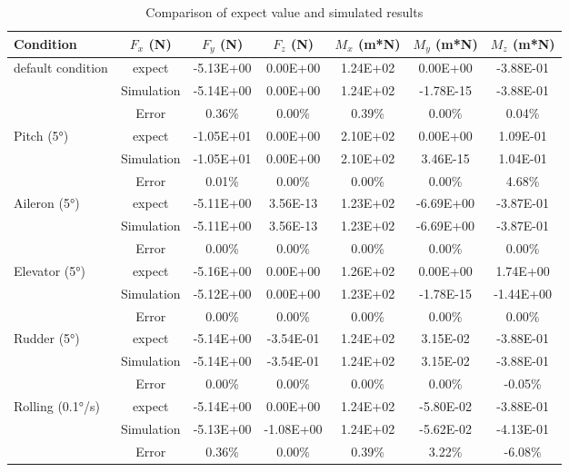 \begin{table}
\centering
\begin{tabular}{|l|c|c|c|c|c|c|}
\hline
\textbf{Condition} & \textbf{$F_{x}$ (N)} & \textbf{$F_{y}$ (N)} & \textbf{$F_{z}$ (N)} & \textbf{$M_{x}$ (m*N)} & \textbf{$M_{y}$ (m*N)} & \textbf{$M_{z}$ (m*N)} \\
\hline
default condition & expect & -5.13E+00 & 0.00E+00 & 1.24E+02 & 0.00E+00 & -3.88E-01 \\
& Simulation & -5.14E+00 & 0.00E+00 & 1.24E+02 & -1.78E-15 & -3.88E-01 \\
& Error & 0.36\% & 0.00\% & 0.39\% & 0.00\% & 0.04\% \\
\hline
Pitch (5°) & expect & -1.05E+01 & 0.00E+00 & 2.10E+02 & 0.00E+00 & 1.09E-01 \\
& Simulation & -1.05E+01 & 0.00E+00 & 2.10E+02 & 3.46E-15 & 1.04E-01 \\
& Error & 0.01\% & 0.00\% & 0.00\% & 0.00\% & 4.68\% \\
\hline
Aileron (5°) & expect & -5.11E+00 & 3.56E-13 & 1.23E+02 & -6.69E+00 & -3.87E-01 \\
& Simulation & -5.11E+00 & 3.56E-13 & 1.23E+02 & -6.69E+00 & -3.87E-01 \\
& Error & 0.00\% & 0.00\% & 0.00\% & 0.00\% & 0.00\% \\
\hline
Elevator (5°) & expect & -5.16E+00 & 0.00E+00 & 1.26E+02 & 0.00E+00 & 1.74E+00 \\
& Simulation & -5.12E+00 & 0.00E+00 & 1.23E+02 & -1.78E-15 & -1.44E+00 \\
& Error & 0.00\% & 0.00\% & 0.00\% & 0.00\% & 0.00\% \\
\hline
Rudder (5°) & expect & -5.14E+00 & -3.54E-01 & 1.24E+02 & 3.15E-02 & -3.88E-01 \\
& Simulation & -5.14E+00 & -3.54E-01 & 1.24E+02 & 3.15E-02 & -3.88E-01 \\
& Error & 0.00\% & 0.00\% & 0.00\% & 0.00\% & -0.05\% \\
\hline
Rolling (0.1°/s) & expect & -5.14E+00 & 0.00E+00 & 1.24E+02 & -5.80E-02 & -3.88E-01 \\
& Simulation & -5.13E+00 & -1.08E+00 & 1.24E+02 & -5.62E-02 & -4.13E-01 \\
& Error & 0.36\% & 0.00\% & 0.39\% & 3.22\% & -6.08\% \\
\hline
\end{tabular}
\caption{Comparison of expect value and simulated results}
\label{tab:Comparison of expect value and simulated results}
\end{table}

